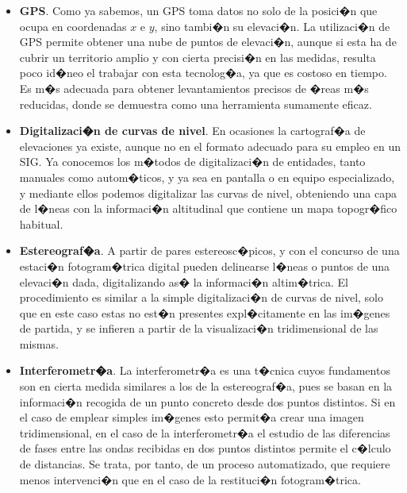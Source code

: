 \begin{itemize}
\item \textbf{GPS}. Como ya sabemos, un GPS toma datos no solo de la posici�n que ocupa en coordenadas $x$ e $y$, sino tambi�n su elevaci�n. La utilizaci�n de GPS permite obtener una nube de puntos de elevaci�n, aunque si esta ha de cubrir un territorio amplio y con cierta precisi�n en las medidas, resulta poco id�neo el trabajar con esta tecnolog�a, ya que es costoso en tiempo. Es m�s adecuada para obtener levantamientos precisos de �reas m�s reducidas, donde se demuestra como una herramienta sumamente eficaz.
\item \textbf{Digitalizaci�n de curvas de nivel}. En ocasiones la cartograf�a de elevaciones ya existe, aunque no en el formato adecuado para su empleo en un SIG. Ya conocemos los m�todos de digitalizaci�n de entidades, tanto manuales como autom�ticos, y ya sea en pantalla o en equipo especializado, y mediante ellos podemos digitalizar las curvas de nivel, obteniendo una capa de l�neas con la informaci�n altitudinal que contiene un mapa topogr�fico habitual.
\item \textbf{Estereograf�a}. A partir de pares estereosc�picos, y con el concurso de una estaci�n fotogram�trica digital pueden delinearse l�neas o puntos de una elevaci�n dada, digitalizando as� la informaci�n altim�trica. El procedimiento es similar a la simple digitalizaci�n de curvas de nivel, solo que en este caso estas no est�n presentes expl�citamente en las im�genes de partida, y se infieren a partir de la visualizaci�n tridimensional de las mismas.
\item \textbf{Interferometr�a}. La interferometr�a es una t�cnica cuyos fundamentos son en cierta medida similares a los de la estereograf�a, pues se basan en la informaci�n recogida de un punto concreto desde dos puntos distintos. Si en el caso de emplear simples im�genes esto permit�a crear una imagen tridimensional, en el caso de la interferometr�a el estudio de las diferencias de fases entre las ondas recibidas en dos puntos distintos permite el c�lculo de distancias. Se trata, por tanto, de un proceso automatizado, que requiere menos intervenci�n que en el caso de la restituci�n fotogram�trica.


\end{itemize}

